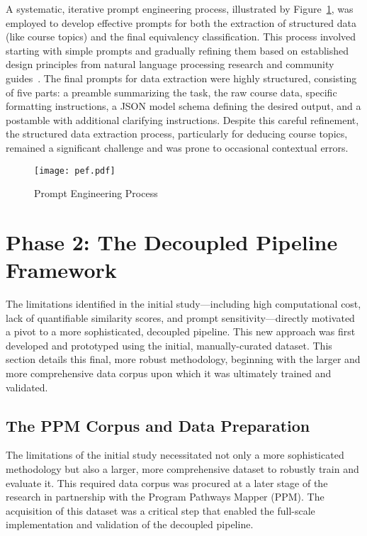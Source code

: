 A systematic, iterative prompt engineering process, illustrated by Figure~\ref{fig:prompt_engineering_process}, was employed to develop effective prompts for both the extraction of structured data (like course topics) and the final equivalency classification. This process involved starting with simple prompts and gradually refining them based on established design principles from natural language processing research and community guides~\cite{ye2024promptengineeringpromptengineer,ppp,peg}. The final prompts for data extraction were highly structured, consisting of five parts: a preamble summarizing the task, the raw course data, specific formatting instructions, a JSON model schema defining the desired output, and a postamble with additional clarifying instructions. Despite this careful refinement, the structured data extraction process, particularly for deducing course topics, remained a significant challenge and was prone to occasional contextual errors.

\begin{figure}[tb]
    \captionsetup{skip=5pt}
    \centering
    \texttt{[image: pef.pdf]}
    \caption{Prompt Engineering Process}
    \label{fig:prompt_engineering_process}
\end{figure}

\section{Phase 2: The Decoupled Pipeline Framework}\label{ch:3.2}
The limitations identified in the initial study—including high computational cost, lack of quantifiable similarity scores, and prompt sensitivity—directly motivated a pivot to a more sophisticated, decoupled pipeline. This new approach was first developed and prototyped using the initial, manually-curated dataset. This section details this final, more robust methodology, beginning with the larger and more comprehensive data corpus upon which it was ultimately trained and validated.

\subsection{The PPM Corpus and Data Preparation}\label{ch:3.2.1}
The limitations of the initial study necessitated not only a more sophisticated methodology but also a larger, more comprehensive dataset to robustly train and evaluate it. This required data corpus was procured at a later stage of the research in partnership with the Program Pathways Mapper (PPM). The acquisition of this dataset was a critical step that enabled the full-scale implementation and validation of the decoupled pipeline.

